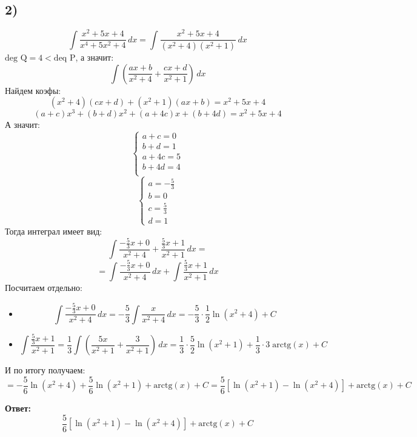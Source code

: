 \documentclass[a4paper,12pt]{article}
\begin{document}
\subsection*{2)}
\[
\int \frac{x^2 + 5x + 4}{x^4 + 5x^2 + 4} \, dx = \int \frac{x^2 + 5x + 4}{(x^2+4)(x^2+1)} \, dx
\]
$\text{deg Q} = 4 < \text{deq P}$, а значит:
\[
\int \left( \frac{ax + b}{x^2+4} + \frac{cx + d}{x^2 + 1}  \right) \, dx
\]
Найдем коэфы:
\[
(x^2+4)(cx+d)  + (x^2+1)(ax+b) = x^2 + 5x + 4
\]
\[
(a+c)x^3 + (b+d)x^2 + (a+4c)x + (b+4d) = x^2 + 5x + 4
\]
А значит:
\[
\begin{cases}
a + c = 0 \\ b + d = 1 \\ a + 4c = 5 \\ b + 4d = 4\\
\end{cases}
\]
\[
\begin{cases}
a = - \frac{5}{3} \\b =  0 \\c =  \frac{5}{3} \\ d = 1
\end{cases}
\]
Тогда интеграл имеет вид:
\[
\int \frac{-\frac{5}{3} x +0 }{x^2+4} + \frac{\frac{5}{3}x + 1}{x^2+1} \, dx = 
\]
\[
=
\int \frac{-\frac{5}{3} x +0 }{x^2+4} \, dx + \int \frac{\frac{5}{3}x + 1}{x^2+1} \, dx  
\]
Посчитаем отдельно:
\begin{itemize}
\item
\[
\int \frac{-\frac{5}{3} x +0 }{x^2+4} \, dx = -\frac{5}{3} \int \frac{x}{x^2+4} \, dx = -\frac{5}{3} \cdot \frac{1}{2} \ln (x^2+4)  + C\] 
\item
\[
 \int \frac{\frac{5}{3}x + 1}{x^2+1} = \frac{1}{3} \int \left( \frac{5x}{x^2+1} + \frac{3}{x^2+1} \right) \,dx  = \frac{1}{3} \cdot \frac{5}{2} \ln(x^2 + 1) + \frac{1}{3} \cdot 3 \;\text{arctg} (x) + C
\]
\end{itemize}
И по итогу получаем:
\[
=-\frac{5}{6} \ln(x^2+4) + \frac{5}{6} \ln(x^2 +1) + \text{arctg} (x) + C = 
\frac{5}{6}\left[\ln(x^2 + 1) - \ln(x^2 + 4) \right] + \text{arctg} (x) + C
\]
\begin{center}
\textbf{Ответ: } 
\[
\frac{5}{6}\left[\ln(x^2 + 1) - \ln(x^2 + 4) \right] + \text{arctg} (x) + C
\]
\end{center}
\end{document}
